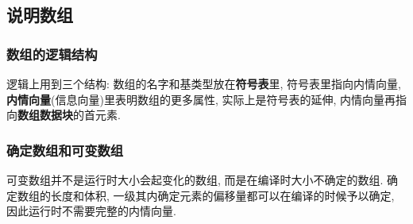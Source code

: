         \subsection{说明数组}

            \subsubsection{数组的逻辑结构}

                逻辑上用到三个结构: 数组的名字和基类型放在\textbf{符号表}里, 符号表里指向内情向量, \textbf{内情向量}(信息向量)里表明数组的更多属性, 实际上是符号表的延伸, 内情向量再指向\textbf{数组数据块}的首元素.

            \subsubsection{确定数组和可变数组}

                \textsf{可变数组}并不是运行时大小会起变化的数组, 而是在编译时大小不确定的数组. \textsf{确定数组}的长度和体积, 一级其内确定元素的偏移量都可以在编译的时候予以确定, 因此运行时不需要完整的内情向量. 
